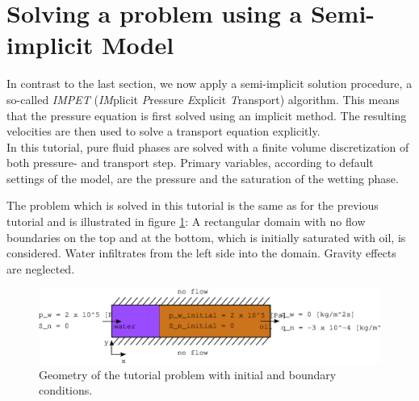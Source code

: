 \section[Semi-implicit model]{Solving a problem using a Semi-implicit Model}\label{tutorial-decoupled}

In contrast to the last section, we now apply a semi-implicit solution procedure, a
so-called \textit{IMPET} (\textit{IM}plicit \textit{P}ressure \textit{E}xplicit 
\textit{T}ransport) algorithm. This means that the pressure equation is first 
solved using an implicit method. The resulting velocities are then used to solve
a transport equation explicitly.\\
In this tutorial, pure fluid phases are solved with a finite volume discretization
of both pressure- and transport step. Primary variables, according to default
settings of the model, are the pressure and the saturation of the wetting phase.

The problem which is solved in this tutorial is the same as for the previous tutorial and is illustrated in figure 
\ref{tutorial-decoupled:problemfigure}: A rectangular domain with no flow 
boundaries on the top and at the bottom, which is initially saturated with oil, 
is considered. Water infiltrates from the left side into the domain. Gravity 
effects are neglected.

\begin{figure}[ht]
\centering
\includegraphics[width=0.9\linewidth,keepaspectratio]{EPS/tutorial-problemconfiguration}
\caption{Geometry of the tutorial problem with initial and boundary conditions.}\label{tutorial-decoupled:problemfigure}
\end{figure}

